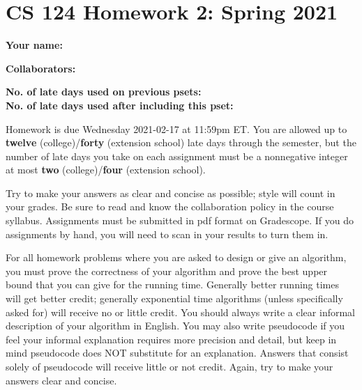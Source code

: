 \documentclass[11pt]{article}
\begin{document}
	
	\section*{CS 124 Homework 2: Spring 2021}
 		
	\textbf{Your name:} 
		
	\textbf{Collaborators:} 

	\textbf{No. of late days used on previous psets: }\\
	\textbf{No. of late days used after including this pset: }

Homework is due Wednesday 2021-02-17 at 11:59pm ET. You are allowed up to {\bf twelve} (college)/{\bf forty} (extension school) late days through the semester, but the number of late days you take on each assignment must be a nonnegative integer at most {\bf two} (college)/{\bf four} (extension school).

Try to make your answers as clear and concise as possible;
style will count in your grades. Be sure to read and know the collaboration policy in the course
syllabus. Assignments must be submitted in pdf format on Gradescope. If you do assignments by hand, you
will need to scan in your results to turn them in. 

For all homework problems where you are asked to design or give an algorithm, you must prove the correctness
of your algorithm and prove the best upper bound that you can give for the running time. Generally
better running times will get better credit; generally exponential time algorithms (unless specifically asked
for) will receive no or little credit. You should always write a clear informal description of your algorithm
in English. You may also write pseudocode if you feel your informal explanation requires more precision
and detail, but keep in mind pseudocode does NOT substitute for an explanation. Answers that consist
solely of pseudocode will receive little or not credit. Again, try to make your answers clear and concise.
\end{document}
